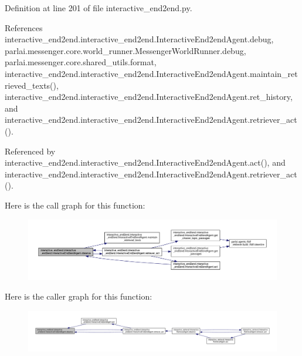 Definition at line 201 of file interactive\+\_\+end2end.\+py.



References interactive\+\_\+end2end.\+interactive\+\_\+end2end.\+Interactive\+End2end\+Agent.\+debug, parlai.\+messenger.\+core.\+world\+\_\+runner.\+Messenger\+World\+Runner.\+debug, parlai.\+messenger.\+core.\+shared\+\_\+utils.\+format, interactive\+\_\+end2end.\+interactive\+\_\+end2end.\+Interactive\+End2end\+Agent.\+maintain\+\_\+retrieved\+\_\+texts(), interactive\+\_\+end2end.\+interactive\+\_\+end2end.\+Interactive\+End2end\+Agent.\+ret\+\_\+history, and interactive\+\_\+end2end.\+interactive\+\_\+end2end.\+Interactive\+End2end\+Agent.\+retriever\+\_\+act().



Referenced by interactive\+\_\+end2end.\+interactive\+\_\+end2end.\+Interactive\+End2end\+Agent.\+act(), and interactive\+\_\+end2end.\+interactive\+\_\+end2end.\+Interactive\+End2end\+Agent.\+retriever\+\_\+act().

Here is the call graph for this function\+:
\nopagebreak
\begin{figure}[H]
\begin{center}
\leavevmode
\includegraphics[width=350pt]{classinteractive__end2end_1_1interactive__end2end_1_1InteractiveEnd2endAgent_a582ae9a8c09b4e0287c79748054eb956_cgraph}
\end{center}
\end{figure}
Here is the caller graph for this function\+:
\nopagebreak
\begin{figure}[H]
\begin{center}
\leavevmode
\includegraphics[width=350pt]{classinteractive__end2end_1_1interactive__end2end_1_1InteractiveEnd2endAgent_a582ae9a8c09b4e0287c79748054eb956_icgraph}
\end{center}
\end{figure}
\mbox{\label{classinteractive__end2end_1_1interactive__end2end_1_1InteractiveEnd2endAgent_a60ab442ea924f06664b432e9c3e9f7aa}} 
